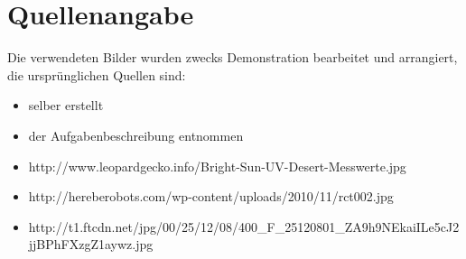 \section*{Quellenangabe}
Die verwendeten Bilder wurden zwecks Demonstration bearbeitet und arrangiert, die ursprünglichen Quellen sind:
\begin{itemize}
	\item selber erstellt
	\item der Aufgabenbeschreibung entnommen
	\item http://www.leopardgecko.info/Bright-Sun-UV-Desert-Messwerte.jpg
	\item http://hereberobots.com/wp-content/uploads/2010/11/rct002.jpg
	\item http://t1.ftcdn.net/jpg/00/25/12/08/400\_F\_25120801\_ZA9h9NEkaiILe5cJ2jjBPhFXzgZ1aywz.jpg
\end{itemize}